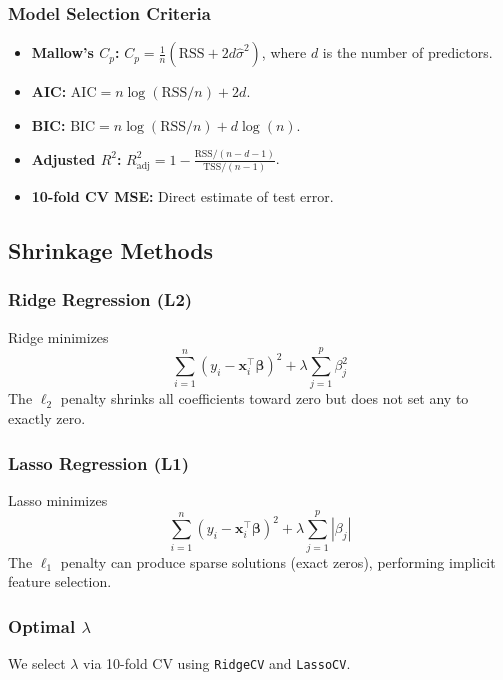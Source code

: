 \documentclass[conference]{IEEEtran}
\begin{document}
\subsubsection{Model Selection Criteria}
\begin{itemize}
    \item \textbf{Mallow's $C_p$:} $C_p = \frac{1}{n}(\text{RSS} + 2d\hat{\sigma}^2)$, where $d$ is the number of predictors.
    \item \textbf{AIC:} $\text{AIC} = n\log(\text{RSS}/n) + 2d$.
    \item \textbf{BIC:} $\text{BIC} = n\log(\text{RSS}/n) + d\log(n)$.
    \item \textbf{Adjusted $R^2$:} $R^2_{\text{adj}} = 1 - \frac{\text{RSS}/(n-d-1)}{\text{TSS}/(n-1)}$.
    \item \textbf{10-fold CV MSE:} Direct estimate of test error.
\end{itemize}

\subsection{Shrinkage Methods}
\label{sec:shrinkage}

\subsubsection{Ridge Regression (L2)}
Ridge minimizes
\begin{equation}
\sum_{i=1}^{n}(y_i - \mathbf{x}_i^\top\boldsymbol{\beta})^2 + \lambda \sum_{j=1}^{p}\beta_j^2
\end{equation}
The $\ell_2$ penalty shrinks all coefficients toward zero but does not set any to exactly zero.

\subsubsection{Lasso Regression (L1)}
Lasso minimizes
\begin{equation}
\sum_{i=1}^{n}(y_i - \mathbf{x}_i^\top\boldsymbol{\beta})^2 + \lambda \sum_{j=1}^{p}|\beta_j|
\end{equation}
The $\ell_1$ penalty can produce sparse solutions (exact zeros), performing implicit feature selection.

\subsubsection{Optimal \texorpdfstring{$\lambda$}{lambda}}
We select $\lambda$ via 10-fold CV using \texttt{RidgeCV} and \texttt{LassoCV}.
\end{document}
